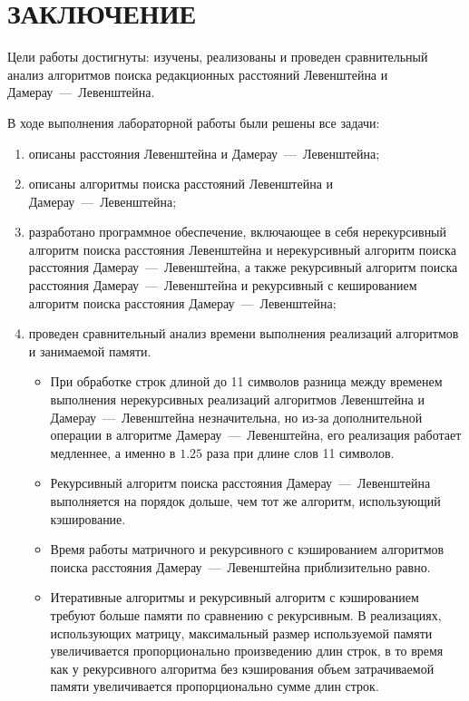 \chapter*{ЗАКЛЮЧЕНИЕ}

Цели работы достигнуты: изучены, реализованы и проведен сравнительный анализ алгоритмов поиска редакционных расстояний Левенштейна и Дамерау~---~Левенштейна.

В ходе выполнения лабораторной работы были решены все задачи: 
\begin{enumerate}
	\item описаны расстояния Левенштейна и Дамерау~---~Левенштейна;
	\item описаны алгоритмы поиска расстояний Левенштейна и Дамерау~---~Левенштейна;
	\item разработано программное обеспечение, включающее в себя нерекурсивный алгоритм поиска расстояния Левенштейна и нерекурсивный алгоритм поиска расстояния Дамерау~---~Левенштейна, а также рекурсивный алгоритм поиска расстояния Дамерау~---~Левенштейна и рекурсивный с кешированием алгоритм поиска расстояния Дамерау~---~Левенштейна;
	\item проведен сравнительный анализ времени выполнения реализаций алгоритмов и занимаемой памяти.
	\begin{itemize}
		\item При обработке строк длиной до 11 символов разница между временем выполнения нерекурсивных реализаций алгоритмов Левенштейна и Дамерау~---~Левенштейна незначительна, но из-за дополнительной операции в алгоритме Дамерау~---~Левенштейна, его реализация работает медленнее, а именно в $1.25$ раза при длине слов 11 символов.
		\item Рекурсивный алгоритм поиска расстояния Дамерау~---~Левенштейна выполняется на порядок дольше, чем тот же алгоритм, использующий кэширование.
		\item Время работы матричного и рекурсивного с кэшированием алгоритмов поиска расстояния Дамерау~---~Левенштейна приблизительно равно.
		\item Итеративные алгоритмы и рекурсивный алгоритм с кэшированием требуют больше памяти по сравнению с рекурсивным. 
		В реализациях, использующих матрицу, максимальный размер используемой памяти увеличивается пропорционально произведению длин строк, в то время как у рекурсивного алгоритма без кэширования объем затрачиваемой памяти увеличивается пропорционально сумме длин строк.
	\end{itemize}
\end{enumerate}